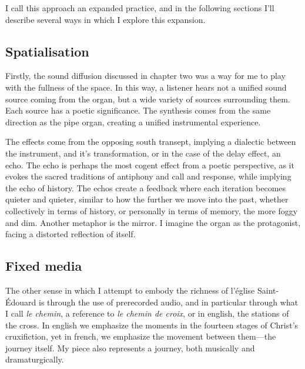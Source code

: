 \documentclass[12pt,twoside,maitrise]{dms_ks}
\theoremstyle{definition}
\begin{document}
{I call this approach an expanded practice, and in the following sections I'll describe several ways in which I explore this expansion.

\subsection{Spatialisation}

Firstly, the sound diffusion discussed in chapter two was a way for me to play with the fullness of the space. 
In this way, a listener hears not a unified sound source coming from the organ, but a wide variety of sources surrounding them. 
Each source has a poetic significance. 
The synthesis comes from the same direction as the pipe organ, creating a unified instrumental experience.

The effects come from the opposing south transept, implying a dialectic between the instrument, and it's transformation, or in the case of the delay effect, an echo. 
The echo is perhaps the most cogent effect from a poetic perspective, as it evokes the sacred traditions of antiphony and call and response, while implying the echo of history. 
The echos create a feedback where each iteration becomes quieter and quieter, similar to how the further we move into the past, whether collectively in terms of history, or personally in terms of memory, the more foggy and dim. 
Another metaphor is the mirror. 
I imagine the organ as the protagonist, facing a distorted reflection of itself.

\subsection{Fixed media}

The other sense in which I attempt to embody the richness of l'église Saint-Édouard is through the use of prerecorded audio, and in particular through what I call \textit{le chemin}, a reference to \textit{le chemin de croix}, or in english, the stations of the cross. 
In english we emphasize the moments in the fourteen stages of Christ's cruxifiction, yet in french, we emphasize the movement between them---the journey itself. 
My piece also represents a journey, both musically and dramaturgically. 

}
\end{document}
